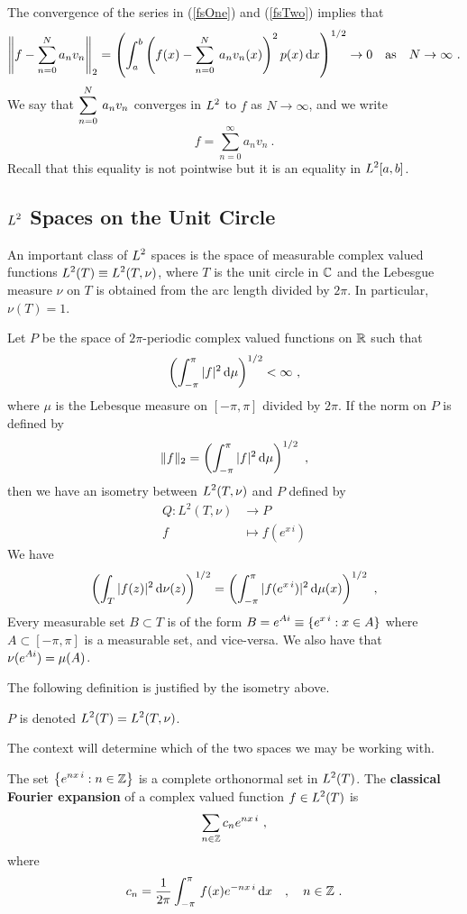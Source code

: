 The convergence of the series in (\ref{fsOne}) and (\ref{fsTwo})
implies that
\[
\left\| f - \sum_{n=0}^{N} a_n v_n \right\|_2
= \left( \int_a^b \left( f(x) - \sum_{n=0}^{N} \: a_n v_n(x) \right)^2
p(x) \,\mathrm{d}{x} \right)^{1/2} \rightarrow 0 \quad \text{as} \quad
N \rightarrow \infty \ .
\]
We say that $\displaystyle \sum_{n=0}^{N} \: a_n v_n$ converges in
$\displaystyle L^2$ to $f$ as $N\rightarrow \infty$, and we write
\[
 f = \sum_{n=0}^\infty a_n v_n \ .
\]
Recall that this equality is not pointwise but it is an equality in
$\displaystyle L^2[a,b]$.

\subsection{$\displaystyle L^2$ Spaces on the Unit Circle}

An important class of $\displaystyle L^2$ spaces is the space of
measurable complex valued functions $\displaystyle L^2(T) \equiv L^2(T,\nu)$,
where $T$ is the unit circle in $\mathbb{C}$ and the Lebesgue measure $\nu$
on $T$ is obtained from the arc length divided by $2\pi$.  In
particular, $\nu(T) =1$.

Let $P$ be the space of $2\pi$-periodic complex valued functions on
$\mathbb{R}$ such that
\[
\left(\int_{-\pi}^\pi |f|^2 \,\mathrm{d}{\mu}\right)^{1/2} < \infty \ ,
\]
where $\mu$ is the Lebesque measure on $[-\pi,\pi]$ divided by $2\pi$.
If the norm on $P$ is defined by
\[
\|f\|_2 = \left(\int_{-\pi}^\pi |f|^2 \,\mathrm{d}{\mu}\right)^{1/2} \ ,
\]
then we have an isometry between $\displaystyle L^2(T,\nu)$ and $P$ defined by
\begin{align*}
Q: L^2(T,\nu) & \rightarrow P \\
  f & \mapsto f(e^{x\,i})
\end{align*}
We have
\[
\left(\int_T |f(z)|^2\dx{\nu}(z) \right)^{1/2}
= \left(\int_{-\pi}^\pi |f(e^{x\,i})|^2\dx{\mu}(x) \right)^{1/2}  \ ,
\]
Every measurable set $B \subset T$ is of the form
$\displaystyle B = e^{Ai} \equiv \{e^{x\,i} : x\in A\}$ where
$A \subset [-\pi,\pi]$
is a measurable set, and vice-versa.   We also have that
$\displaystyle \nu(e^{Ai}) = \mu(A)$.

The following definition is justified by the isometry above.

\begin{defn}
$P$ is denoted $\displaystyle L^2(T) = L^2(T,\nu)$.
\end{defn}

The context will determine which of the two spaces we may be working with.

The set $\displaystyle \left\{ e^{n x\, i} : n \in \mathbb{Z} \right\}$ is a
complete orthonormal set in $\displaystyle L^2(T)$.  The
{\bfseries classical Fourier expansion}
of a complex valued function $\displaystyle f \in L^2(T)$ is
\[
\sum_{n\in \mathbb{Z}} c_n e^{n x\, i} \ ,
\]
where
\begin{equation} \label{fa_coeff_cfs}
c_n = \frac{1}{2\pi} \int_{-\pi}^{\pi} \, f(x) e^{-n x\, i} \,\mathrm{d}{x} \quad
, \quad n \in \mathbb{Z} \ .
\end{equation}

